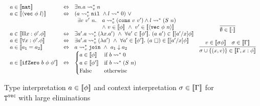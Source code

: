 \documentclass[copyright]{eptcs}
\newcommand{\vc}[0]{\texttt{vec}}
\newcommand{\nat}[0]{\texttt{nat}}
\newcommand{\Tvec}[0]{\texttt{T}^\vc}
\newcommand{\nil}[0]{\texttt{nil}}
\newcommand{\cons}[0]{\texttt{cons}}
\newcommand{\join}[0]{\texttt{join}}
\newcommand{\leadstov}[0]{\leadsto_v}
\newcommand{\ifzero}[0]{\texttt{ifZero}}
\newcommand{\impapp}[0]{\raisebox{-0.2ex}{$\square$}}
\newcommand{\interp}[1]{[\negthinspace[#1]\negthinspace]}
\begin{document}
\begin{figure}
\[
\begin{array}{ll}
\begin{array}{lll}
a \in \interp{\nat} & \Leftrightarrow & \exists n. a \leadstov^* n \\
a \in \interp{\langle\vc\ \phi\ l\rangle} & \Leftrightarrow & (a\leadstov^* \nil\ \land  l \leadsto^* 0) \ \lor \\
 & & \begin{array}{ll} \exists v\ v'\ n. & a\leadstov^* (\cons\ v\ v') \land l \leadsto^* (S\ n) \\
\ & \land\ v \in \interp{\phi} 
\ \land\ v'\in \interp{\langle\vc\ \phi\ n\rangle}\\
\end{array}\\
a\in\interp{\Pi x:\phi'.\phi} & \Leftrightarrow &  \exists a'.a \leadstov^* (\lambda x.a')
\ \land\  \forall a'\in\interp{\phi'}.\ (a\ a')\in\interp{[a'/x]\phi} \\
a\in\interp{\forall x:\phi'.\phi} & \Leftrightarrow &  \exists a'.a \leadstov^* (\lambda a')
\ \land\ \forall a'\in\interp{\phi'}.\ (a\ \impapp)\in\interp{[a'/x]\phi} \\
a \in \interp{a_1 = a_2} & \Leftrightarrow &  a \leadstov^* \join \ \land\ a_1 \downarrow a_2 \\
a \in \interp{\ifzero\ b\ \phi\ \phi'} & \Leftrightarrow & \begin{cases} a \in \interp{\phi} & \text{if } b \leadsto^* 0  \\ 
                                                                         a \in \interp{\phi'} & \text{if } b \leadsto^* (S\ n) \\ 
                                                                         \text{False} & \text{otherwise} \end{cases} \\
\end{array}
\begin{array}{c}
\infer{\emptyset\in\interp{\cdot}}{\ } \\
\\
\infer{\sigma\cup\{(x,v)\}\in\interp{\Gamma,x:\phi}}
      {v\in\interp{\sigma\phi} & \sigma \in\interp{\Gamma}}
\end{array}
\end{array}
\]
\caption{Type interpretation $a\in\interp{\phi}$ and context interpretation $\sigma \in \interp{\Gamma}$ for $\Tvec$ with large eliminations}
\label{fig:large_interp}
\end{figure}
\end{document}
